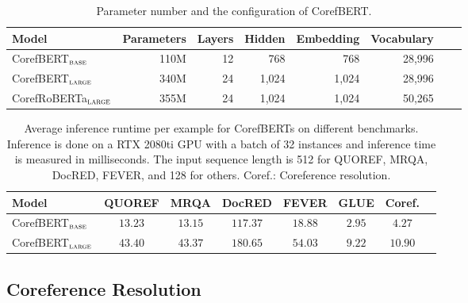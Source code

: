 \documentclass[11pt,a4paper]{article}
\newcommand\BASESIZE{$_{\small \textsc{base}}$\xspace}
\newcommand\LARGESIZE{$_{\small \textsc{large}}$\xspace}
\begin{document}
\begin{table*}[!t]
\small
\centering
\begin{tabular}{l r r r r r r r}
\toprule
Model  & Parameters & Layers & Hidden & Embedding & Vocabulary\\
\midrule
CorefBERT\BASESIZE & 110M & 12 & 768& 768&  28,996\\
CorefBERT\LARGESIZE & 340M & 24 & 1,024& 1,024&  28,996\\
CorefRoBERTa\LARGESIZE & 355M & 24 & 1,024& 1,024& 50,265 &\\
\bottomrule
\end{tabular}
\caption{Parameter number and the configuration of CorefBERT.}
\label{number_of_parameters}
\end{table*}


\begin{table*}[!t]
\small
\centering
\begin{tabular}{l c c c c c c c}
\toprule
Model  & QUOREF & MRQA & DocRED & FEVER & GLUE & Coref.\\
\midrule
CorefBERT\BASESIZE & $13.23$  &  $13.15$  & $117.37$ & $18.88$ & $2.95$ & $4.27$\\
CorefBERT\LARGESIZE & $43.40$  & $43.37$  & $180.65$& $54.03$ & $9.22$ & $10.90$\\
\bottomrule
\end{tabular}
\caption{Average inference runtime per example for CorefBERTs on different benchmarks. Inference is done on a RTX 2080ti GPU with a batch of 32 instances and inference time is measured in milliseconds.  The input sequence length is 512 for QUOREF, MRQA, DocRED, FEVER, and 128 for others. Coref.: Coreference resolution. }
\label{average_runtime}
\end{table*}


\subsection{Coreference Resolution}
\end{document}
